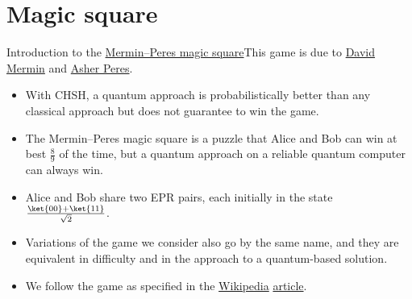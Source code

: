 \section*{Magic square}
{
\def\MPC#1{\fbox{\hbox to 5ex{\hss\mbox{#1}\vrule width 0pt height 3ex depth 2ex\hss}}}
\def\XP#1{\hbox to 3ex{\hss#1\hss 1}}%
\def\PP{%
\XP{$+$}}%
\def\MM{%
\XP{$-$}}%
\def\MPSquare#1#2#3#4#5#6#7#8#9{%
{%
    \setlength{\tabcolsep}{0pt}%
    \adjustbox{valign=t}{\begin{tabular}{rrccc}
   \multicolumn{1}{c}{ } & \multicolumn{1}{c}{ } & \multicolumn{3}{c}{$\downarrow\ $Bob$\ \downarrow$} \\
    & & 1 & 2 & 3 \\
        $\rightarrow\ $ & \ 1\ \ & \MPC{#1} & \MPC{#2} & \MPC{#3} \\
        \mbox{Alice }& \ 2\ \ & \MPC{#4} & \MPC{#5} & \MPC{#6} \\
        $\rightarrow\ $&\ 3\ \ & \MPC{#7} & \MPC{#8} & \MPC{#9} \\
    \end{tabular}}}}
\def\VS#1#2{\visible<#1>{#2}}
\begin{frame}{Introduction to the \href{https://en.wikipedia.org/wiki/Quantum_pseudo-telepathy\#The_Mermin\%E2\%80\%93Peres_magic_square_game}{Mermin--Peres magic square}}{This game is due to \href{https://en.wikipedia.org/wiki/N._David_Mermin}{David Mermin} and \href{https://en.wikipedia.org/wiki/Asher_Peres}{Asher Peres}.}

\begin{itemize}[<+->]
    \item With CHSH, a quantum approach is probabilistically better than any classical approach but does not guarantee to win the game.
    \item The Mermin--Peres magic square is a puzzle that Alice and Bob can win at best $\frac{8}{9}$ of the time, but a quantum approach on a reliable quantum computer can always win.
    \item Alice and Bob share two EPR pairs, each initially in the state $\frac{\ket{00}+\ket{11}}{\sqrt{2}}$.
    \item Variations of the game we consider also go by the same name, and they are equivalent in difficulty and in the approach to a quantum-based solution.
    \item We follow the game as specified in the
    \href{https://en.wikipedia.org/wiki/Wiki}{Wikipedia} \href{https://en.wikipedia.org/wiki/Quantum_pseudo-telepathy\#The_Mermin\%E2\%80\%93Peres_magic_square_game}{article}.
\end{itemize}
    

\end{frame}}
